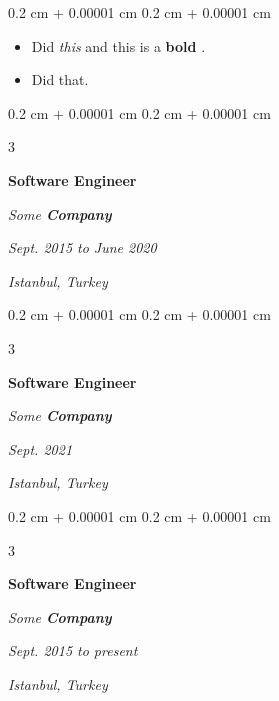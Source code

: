 \documentclass[10pt, letterpaper]{article}
\newenvironment{highlights}{
    \begin{itemize}[
        topsep=0.10 cm,
        parsep=0.10 cm,
        partopsep=0pt,
        itemsep=0pt,
        leftmargin=0.4 cm + 10pt + 0.6 cm
    ]
}{
    \end{itemize}
} %
\newenvironment{onecolentry}{
    \begin{adjustwidth}{
        0.2 cm + 0.00001 cm
    }{
        0.2 cm + 0.00001 cm
    }
}{
    \end{adjustwidth}
} %
\newenvironment{threecolentry}[3][]{
    \onecolentry
    \def\thirdColumn{#3}
    \setcolumnwidth{0.6 cm, \fill, 4.1 cm}
    \begin{paracol}{3}
    #2 \switchcolumn
}{
    \switchcolumn \raggedleft \thirdColumn
    \end{paracol}
    \endonecolentry
} %
\let\hrefWithoutArrow\href
\renewcommand{\href}[2]{\hrefWithoutArrow{#1}{\mbox{\ifthenelse{\equal{#2}{}}{ }{#2 }\raisebox{.15ex}{\footnotesize \faExternalLink*}}}}
\begin{document}
        \vspace{0.10 cm}
        \begin{onecolentry}
            \begin{highlights}
                \item Did \textit{this} and this is a \textbf{bold} \href{https://example.com}{link}.
                \item Did that.
            \end{highlights}
        \end{onecolentry}


        \vspace{0.2 cm}

        \begin{threecolentry}{
            \vspace*{\fill}
            \textbullet
            \vspace*{3px}
            \vspace*{\fill}
        }{
        \textit{Sept. 2015 to June 2020}
            
        \textit{Istanbul, Turkey}}
            \textbf{Software Engineer}
            
            \textit{Some \textbf{Company}}
        \end{threecolentry}



        \vspace{0.2 cm}

        \begin{threecolentry}{
            \vspace*{\fill}
            \textbullet
            \vspace*{3px}
            \vspace*{\fill}
        }{
        \textit{Sept. 2021}
            
        \textit{Istanbul, Turkey}}
            \textbf{Software Engineer}
            
            \textit{Some \textbf{Company}}
        \end{threecolentry}



        \vspace{0.2 cm}

        \begin{threecolentry}{
            \vspace*{\fill}
            \textbullet
            \vspace*{3px}
            \vspace*{\fill}
        }{
        \textit{Sept. 2015 to present}
            
        \textit{Istanbul, Turkey}}
            \textbf{Software Engineer}
            
            \textit{Some \textbf{Company}}
        \end{threecolentry}
\end{document}
